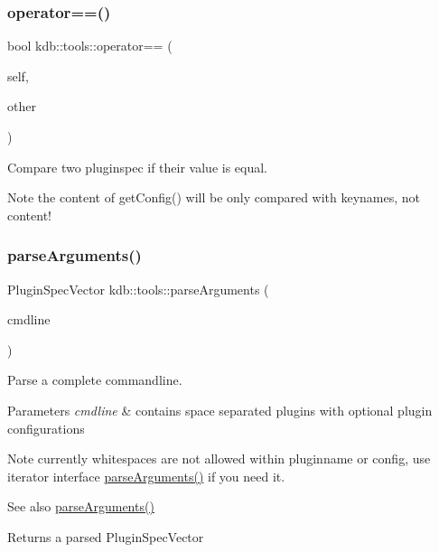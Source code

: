 \subsubsection{\texorpdfstring{operator==()}{operator==()}}
{\footnotesize\ttfamily bool kdb\+::tools\+::operator== (\begin{DoxyParamCaption}\item[{\mbox{\hyperlink{classkdb_1_1tools_1_1PluginSpec}{Plugin\+Spec}} const \&}]{self,  }\item[{\mbox{\hyperlink{classkdb_1_1tools_1_1PluginSpec}{Plugin\+Spec}} const \&}]{other }\end{DoxyParamCaption})}



Compare two pluginspec if their value is equal. 

\begin{DoxyNote}{Note}
the content of get\+Config() will be only compared with keynames, not content! 
\end{DoxyNote}
\mbox{\label{namespacekdb_1_1tools_a3c08f8fdabc7002ff497b247cba6bb21}} 
\subsubsection{\texorpdfstring{parseArguments()}{parseArguments()}\hspace{0.1cm}{\footnotesize\ttfamily [1/2]}}
{\footnotesize\ttfamily Plugin\+Spec\+Vector kdb\+::tools\+::parse\+Arguments (\begin{DoxyParamCaption}\item[{std\+::string const \&}]{cmdline }\end{DoxyParamCaption})}



Parse a complete commandline. 


\begin{DoxyParams}{Parameters}
{\em cmdline} & contains space separated plugins with optional plugin configurations\\
\hline
\end{DoxyParams}
\begin{DoxyNote}{Note}
currently whitespaces are not allowed within pluginname or config, use iterator interface \mbox{\hyperlink{namespacekdb_1_1tools_a3c08f8fdabc7002ff497b247cba6bb21}{parse\+Arguments()}} if you need it.
\end{DoxyNote}
\begin{DoxySeeAlso}{See also}
\mbox{\hyperlink{namespacekdb_1_1tools_a3c08f8fdabc7002ff497b247cba6bb21}{parse\+Arguments()}} 
\end{DoxySeeAlso}
\begin{DoxyReturn}{Returns}
a parsed Plugin\+Spec\+Vector 
\end{DoxyReturn}
\mbox{\label{namespacekdb_1_1tools_ab7ffe14ed9cab32c07ddb55a8a65973a}} 
